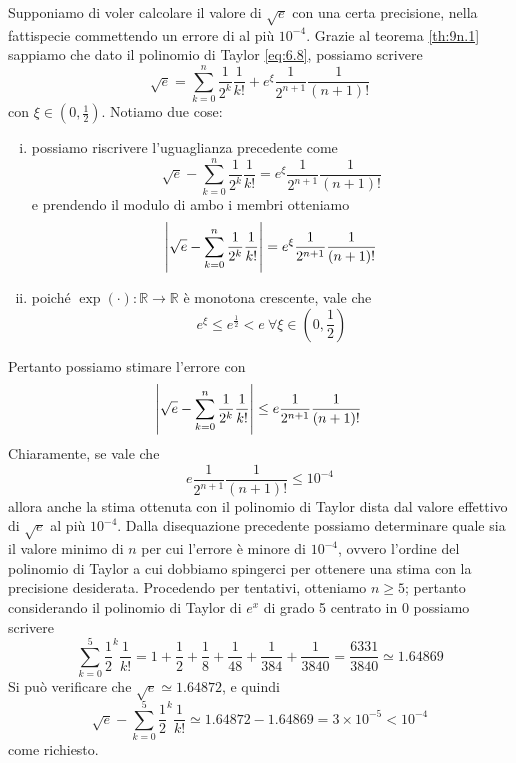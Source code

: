\begin{example}
    Supponiamo di voler calcolare il valore di $\sqrt{e}$ con una certa precisione, nella fattispecie commettendo un errore di al più $10^{-4}$. Grazie al teorema \ref{th:9n.1} sappiamo che dato il polinomio di Taylor \eqref{eq:6.8}, possiamo scrivere
    \[
    \sqrt{e}=\sum_{k=0}^n\frac{1}{2^k}\frac{1}{k!} + e^{\xi}\frac{1}{2^{n+1}}\frac{1}{(n+1)!}
    \]
    con $\xi\in\left(0,\frac{1}{2}\right)$. Notiamo due cose:
    \begin{enumerate}[(i)]
        \item possiamo riscrivere l'uguaglianza precedente come
        \[
        \sqrt{e}-\sum_{k=0}^n\frac{1}{2^k}\frac{1}{k!} = e^{\xi}\frac{1}{2^{n+1}}\frac{1}{(n+1)!}
        \]
        e prendendo il modulo di ambo i membri otteniamo
        \[
        \abs{\sqrt{e}-\sum_{k=0}^n\frac{1}{2^k}\frac{1}{k!}} = e^{\xi}\frac{1}{2^{n+1}}\frac{1}{(n+1)!}
        \]
        \item poiché $\exp(\cdot)\colon \mathbb{R}\to\mathbb{R}$ è monotona crescente, vale che 
        \[
        e^\xi \le e^{\frac{1}{2}} < e \ \forall \xi\in\left(0,\frac{1}{2}\right)
        \]
    \end{enumerate}
    Pertanto possiamo stimare l'errore con
    \[
    \abs{\sqrt{e}-\sum_{k=0}^n\frac{1}{2^k}\frac{1}{k!}} \le e\frac{1}{2^{n+1}}\frac{1}{(n+1)!}
    \]
    Chiaramente, se vale che
    \[
    e\frac{1}{2^{n+1}}\frac{1}{(n+1)!} \le 10^{-4}
    \]
    allora anche la stima ottenuta con il polinomio di Taylor dista dal valore effettivo di $\sqrt{e}$ al più $10^{-4}$. Dalla disequazione precedente possiamo determinare quale sia il valore minimo di $n$ per cui l'errore è minore di $10^{-4}$, ovvero l'ordine del polinomio di Taylor a cui dobbiamo spingerci per ottenere una stima con la precisione desiderata. Procedendo per tentativi, otteniamo $n\ge 5$; pertanto considerando il polinomio di Taylor di $e^x$ di grado 5 centrato in 0 possiamo scrivere
    \[
    \sum_{k=0}^5 \frac{1}{2}^k \frac{1}{k!} = 1+\frac{1}{2}+\frac{1}{8}+\frac{1}{48}+\frac{1}{384}+\frac{1}{3840} = \frac{6331}{3840}\simeq 1.64869
    \]
    Si può verificare che $\sqrt{e}\simeq 1.64872$, e quindi
    \[
    \sqrt{e}-\sum_{k=0}^5 \frac{1}{2}^k \frac{1}{k!}  \simeq 1.64872-1.64869 = 3\times 10^{-5}<10^{-4}
    \]
    come richiesto.
\end{example}
